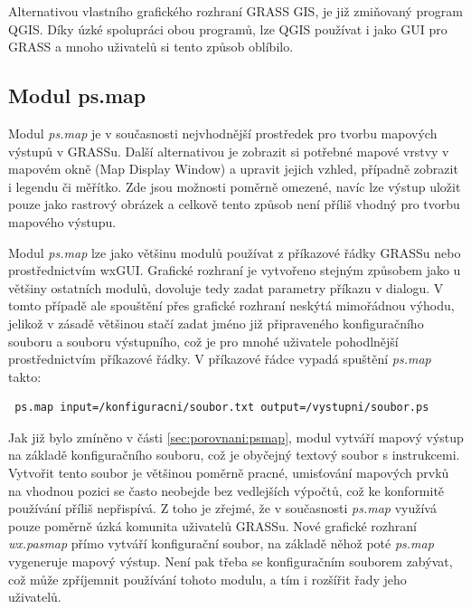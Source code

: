 \documentclass[a4paper,12pt,draft]{article}
\newcommand{\modul}[1]{\emph{#1}}
\begin{document}
Alternativou vlastního grafického rozhraní GRASS GIS, je již zmiňovaný
program QGIS. Díky úzké spolupráci obou programů, lze QGIS používat i jako GUI
pro GRASS a mnoho uživatelů si tento způsob oblíbilo.

\subsection{Modul ps.map}
\label{sec:psmap}
Modul \modul{ps.map} je v současnosti nejvhodnější prostředek pro tvorbu
mapových výstupů v GRASSu. Další alternativou je zobrazit si potřebné
mapové vrstvy v mapovém okně (Map Display Window)  a upravit jejich vzhled,
případně zobrazit i legendu či měřítko. Zde jsou možnosti poměrně
omezené, navíc lze výstup uložit pouze jako rastrový obrázek a celkově
tento způsob není příliš vhodný pro tvorbu mapového výstupu.

Modul \modul{ps.map} lze jako většinu modulů používat z příkazové
řádky GRASSu nebo pro\-střed\-nic\-tvím wxGUI. Grafické rozhraní
je vytvořeno stejným způsobem jako u většiny ostatních modulů,
dovoluje tedy zadat parametry příkazu v dialogu. V tomto případě ale
spouštění přes grafické rozhraní neskýtá mimořádnou výhodu,
jelikož v zásadě většinou stačí zadat jméno již připraveného
konfiguračního souboru a souboru výstupního, což je pro mnohé uživatele
pohodlnější prostřednictvím příkazové řádky. V příkazové řádce
vypadá spuštění \modul{ps.map} takto:
\begin{verbatim}
 ps.map input=/konfiguracni/soubor.txt output=/vystupni/soubor.ps
\end{verbatim}

Jak již bylo zmíněno v části \ref{sec:porovnani:psmap}, modul vytváří
mapový výstup na základě konfiguračního souboru, což je obyčejný
textový soubor s instrukcemi. Vytvořit tento soubor je většinou poměrně
pracné, umisťování mapových prvků na vhodnou pozici se často neobejde
bez vedlejších výpočtů, což ke konformitě používání příliš
nepřispívá. Z toho je zřejmé, že v současnosti \modul{ps.map} využívá
pouze poměrně úzká komunita uživatelů GRASSu. Nové grafické rozhraní
\emph{wx.pasmap} přímo vytváří konfigurační soubor, na základě
něhož poté \modul{ps.map} vygeneruje mapový výstup. Není pak třeba
se konfiguračním souborem zabývat, což může zpříjemnit používání
tohoto modulu, a tím i rozšířit řady jeho uživatelů.
\end{document}
